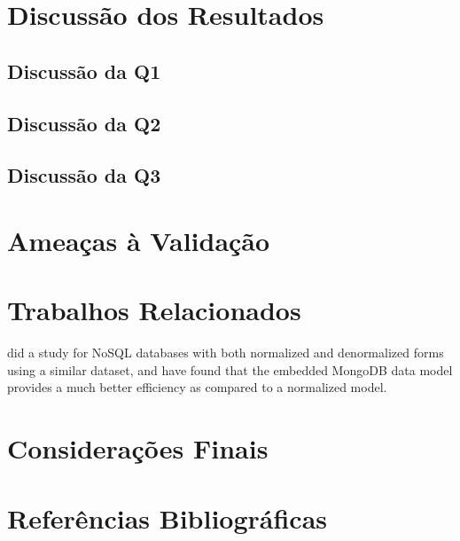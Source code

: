 \documentclass[12pt]{article}
\begin{document}
\section{Discussão dos Resultados}
\label{section:discussao}

\subsection{Discussão da Q1}

\subsection{Discussão da Q2}

\subsection{Discussão da Q3}


\section{Ameaças à Validação}
\label{section:limitacoes}



\section{Trabalhos Relacionados} 
\label{section:relacionados}

\cite{kanade2014study} did a study for NoSQL databases with both normalized and denormalized forms using a similar dataset, and have found that the embedded MongoDB
data model provides a much better efficiency as compared to a normalized model. 


\section{Considerações Finais}
\label{section:consideracoes}

\section{Referências Bibliográficas}



\end{document}
